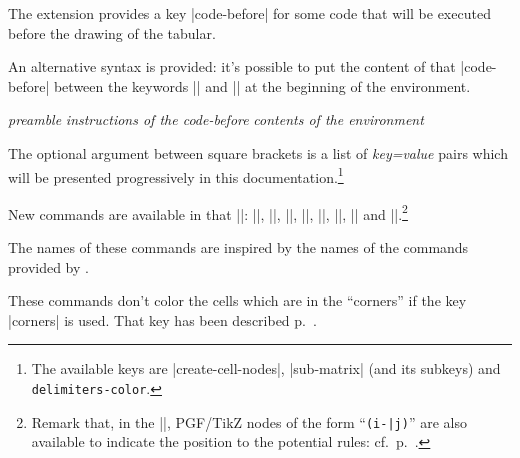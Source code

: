 \documentclass[dvipsnames]{article}%
\begin{document}
\medskip
The extension  provides a key |code-before| for some code that
will be executed before the drawing of the tabular. 

\medskip 
An alternative syntax is provided: it's possible to put the content of that
|code-before| between the keywords |\CodeBefore| and |\Body| at the beginning
of the environment.

\begin{Code}
\begin{pNiceArray}{\textsl{preamble}}
\emph{}
  \textsl{instructions of the code-before}
\emph{\Body}
  \textsl{contents of the environment}
\end{pNiceArray}
\end{Code}

\smallskip
The optional argument between square brackets is a list of \textsl{key=value}
pairs which will be presented progressively in this
documentation.\footnote{The available keys are |create-cell-nodes|,
|sub-matrix| (and its subkeys) and \texttt{delimiters-color}.}

\medskip
New commands are available in that |\CodeBefore|: |\cellcolor|,
|\rectanglecolor|, |\rowcolor|, |\columncolor|, |\rowcolors|,
|\rowlistcolors|, |\chessboardcolors| and |\arraycolor|.\footnote{Remark that,
in the |\CodeBefore|, PGF/TikZ nodes of the form ``\verb+(i-|j)+'' are
also available to indicate the position to the potential rules:
cf.~p.~\pageref{nodes-i}.}
\label{code-before}


The names of these commands are inspired by the names of the commands provided
by .


\medskip
These commands don't color the cells which are in the ``corners'' if the key
|corners| is used. That key has been described p.~\pageref{corners}.
\end{document}
